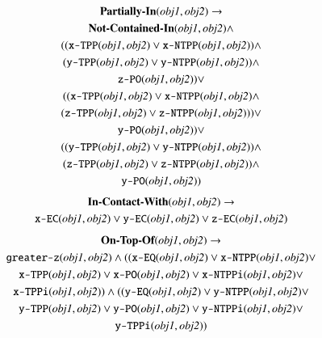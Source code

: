 \documentclass[preprint,12pt]{elsarticle}
\begin{document}
\begin{gather}
\label{eq:partially-in}
\textbf{Partially-In}(\textit{obj1}, \textit{obj2}) \rightarrow \\
\textbf{Not-Contained-In}(\textit{obj1}, \textit{obj2}) \wedge \notag\\
((\texttt{x-TPP}(\textit{obj1}, \textit{obj2}) \vee \texttt{x-NTPP}(\textit{obj1}, \textit{obj2})) \wedge  \notag\\
(\texttt{y-TPP}(\textit{obj1}, \textit{obj2}) \vee \texttt{y-NTPP}(\textit{obj1}, \textit{obj2})) \wedge \notag\\
\texttt{z-PO}(\textit{obj1}, \textit{obj2})) \vee  \notag\\
((\texttt{x-TPP}(\textit{obj1}, \textit{obj2}) \vee \texttt{x-NTPP}(\textit{obj1}, \textit{obj2})\wedge \notag\\
(\texttt{z-TPP}(\textit{obj1}, \textit{obj2}) \vee \texttt{z-NTPP}(\textit{obj1}, \textit{obj2}))) \vee  \notag\\
\texttt{y-PO}(\textit{obj1}, \textit{obj2})) \vee  \notag\\
((\texttt{y-TPP}(\textit{obj1}, \textit{obj2}) \vee \texttt{y-NTPP}(\textit{obj1}, \textit{obj2})) \wedge  \notag\\
(\texttt{z-TPP}(\textit{obj1}, \textit{obj2}) \vee \texttt{z-NTPP}(\textit{obj1}, \textit{obj2}))  \wedge \notag\\
\texttt{y-PO}(\textit{obj1}, \textit{obj2})) \notag
\end{gather}
\begin{gather}
\label{eq:in-contact-with}
\textbf{In-Contact-With}(\textit{obj1}, \textit{obj2}) \rightarrow \\
\texttt{x-EC}(\textit{obj1}, \textit{obj2}) \vee \texttt{y-EC}(\textit{obj1}, \textit{obj2}) \vee \texttt{z-EC}(\textit{obj1}, \textit{obj2})\notag
\end{gather}
\begin{gather}
\label{eq:on-top-of}
\textbf{On-Top-Of}(\textit{obj1}, \textit{obj2}) \rightarrow  \\
\texttt{greater-z}(\textit{obj1}, \textit{obj2}) \wedge ((\texttt{x-EQ}(\textit{obj1}, \textit{obj2}) \vee \texttt{x-NTPP}(\textit{obj1}, \textit{obj2}) \vee \notag\\
\texttt{x-TPP}(\textit{obj1}, \textit{obj2}) \vee \texttt{x-PO}(\textit{obj1}, \textit{obj2}) \vee \texttt{x-NTPPi}(\textit{obj1}, \textit{obj2}) \vee \notag\\
\texttt{x-TPPi}(\textit{obj1}, \textit{obj2})) \wedge ((\texttt{y-EQ}(\textit{obj1}, \textit{obj2}) \vee \texttt{y-NTPP}(\textit{obj1}, \textit{obj2}) \vee \notag\\
\texttt{y-TPP}(\textit{obj1}, \textit{obj2}) \vee \texttt{y-PO}(\textit{obj1}, \textit{obj2}) \vee \texttt{y-NTPPi}(\textit{obj1}, \textit{obj2}) \vee \notag\\
\texttt{y-TPPi}(\textit{obj1}, \textit{obj2})) \notag
\end{gather}
\end{document}
